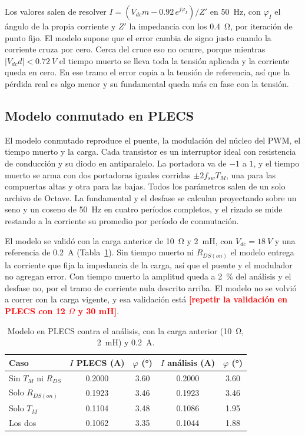 \documentclass[journal]{IEEEtran}
\newcommand{\pendiente}[1]{\textcolor{red}{\textbf{[#1]}}}
\begin{document}
Los valores salen de resolver $I=(V_{dc}m-0.92\,e^{j\varphi_I})/Z'$ en \SI{50}{Hz}, con $\varphi_I$ el ángulo de la propia corriente y $Z'$ la impedancia con los \SI{0.4}{\ohm}, por iteración de punto fijo. El modelo supone que el error cambia de signo justo cuando la corriente cruza por cero. Cerca del cruce eso no ocurre, porque mientras $|V_{dc}d|<\SI{0.72}{V}$ el tiempo muerto se lleva toda la tensión aplicada y la corriente queda en cero. En ese tramo el error copia a la tensión de referencia, así que la pérdida real es algo menor y su fundamental queda más en fase con la tensión.

\subsection{Modelo conmutado en PLECS}
\label{sec:plecs}
El modelo conmutado reproduce el puente, la modulación del núcleo del PWM, el tiempo muerto y la carga. Cada transistor es un interruptor ideal con resistencia de conducción y su diodo en antiparalelo. La portadora va de $-1$ a $1$, y el tiempo muerto se arma con dos portadoras iguales corridas $\pm2f_{sw}T_M$, una para las compuertas altas y otra para las bajas. Todos los parámetros salen de un solo archivo de Octave. La fundamental y el desfase se calculan proyectando sobre un seno y un coseno de \SI{50}{Hz} en cuatro períodos completos, y el rizado se mide restando a la corriente su promedio por período de conmutación.

El modelo se validó con la carga anterior de \SI{10}{\ohm} y \SI{2}{mH}, con $V_{dc}=\SI{18}{V}$ y una referencia de \SI{0.2}{A} (Tabla~\ref{tab:plecs}). Sin tiempo muerto ni $R_{DS(on)}$ el modelo entrega la corriente que fija la impedancia de la carga, así que el puente y el modulador no agregan error. Con tiempo muerto la amplitud queda a \SI{2}{\percent} del análisis y el desfase no, por el tramo de corriente nula descrito arriba. El modelo no se volvió a correr con la carga vigente, y esa validación está \pendiente{repetir la validación en PLECS con 12 $\Omega$ y 30 mH}.

\begin{table}[!ht]
	\centering
	\caption{Modelo en PLECS contra el análisis, con la carga anterior (\SI{10}{\ohm}, \SI{2}{mH}) y \SI{0.2}{A}.}
	\label{tab:plecs}
	\begin{tabular}{lcccc}
		\toprule
		Caso & $I$ PLECS (A) & $\varphi$ (°) & $I$ análisis (A) & $\varphi$ (°) \\
		\midrule
		Sin $T_M$ ni $R_{DS}$ & \num{0.2000} & \num{3.60} & \num{0.2000} & \num{3.60} \\
		Solo $R_{DS(on)}$ & \num{0.1923} & \num{3.46} & \num{0.1923} & \num{3.46} \\
		Solo $T_M$ & \num{0.1104} & \num{3.48} & \num{0.1086} & \num{1.95} \\
		Los dos & \num{0.1062} & \num{3.35} & \num{0.1044} & \num{1.88} \\
		\bottomrule
	\end{tabular}
\end{table}
\end{document}
